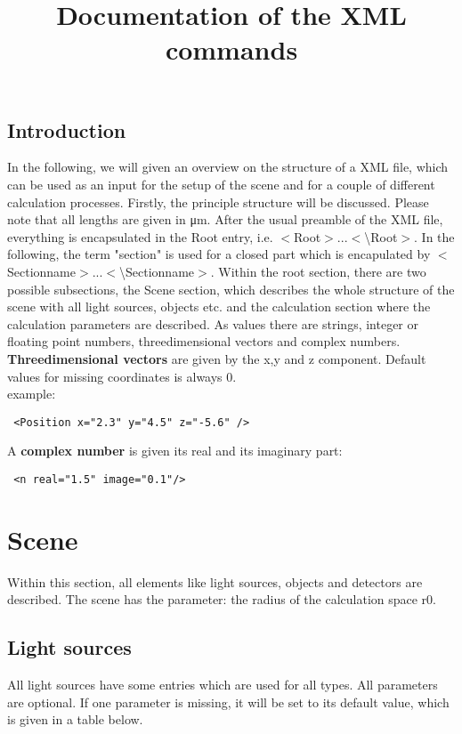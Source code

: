 \documentclass[a4paper,html,11pt,openany]{book}
\begin{document}
  \title{Documentation of the XML commands}
  \tableofcontents   
  \section*{Introduction}
  In the following, we will given an overview on the structure of a XML file, which can be used as an input for the setup of the scene and for a couple of different calculation processes. Firstly, the principle structure will be discussed. Please note that all lengths are given in \si{\micro\metre}. After the usual preamble of the XML file, everything is encapsulated in the Root entry, i.e. $<$Root$>...<$\textbackslash Root$>$.   
   In the following, the term "section" is used for a closed part which is encapulated by $<$Sectionname$>...<$\textbackslash Sectionname$>$. Within the root section, there are two possible subsections, the Scene section, which describes the whole structure of the scene with all light sources, objects etc. and the calculation section where the calculation parameters are described. As values there are strings, integer or floating point numbers, threedimensional vectors and complex numbers. \textbf{Threedimensional vectors} are given by the x,y and z component. Default values for missing coordinates is always 0. \\
   example: 
    \lstset{language=XML}
 \begin{lstlisting}
 <Position x="2.3" y="4.5" z="-5.6" />
   \end{lstlisting}
   A \textbf{complex number} is given its real and its imaginary part: 
 \begin{lstlisting}
 <n real="1.5" image="0.1"/>
   \end{lstlisting}
   
 \chapter{Scene}
 Within this section, all elements like light sources, objects and detectors are described. The scene has the parameter: the radius of the calculation space r0.
   
 \section{Light sources}
 All light sources have some entries which are used for all types. All parameters are optional. If one parameter is missing, it will be set to its default value, which is given in a table below. \\
\end{document}
